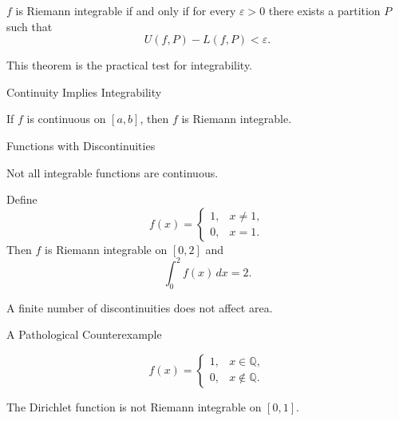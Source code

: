 \documentclass[12pt, a4paper]{article}
\begin{document}
\clearpage

\begin{theorem}
$f$ is Riemann integrable if and only if for every $\varepsilon>0$
there exists a partition $P$ such that
\[
U(f,P)-L(f,P)<\varepsilon.
\]
\end{theorem}

This theorem is the practical test for integrability.

\clearpage

\begin{heading}
Continuity Implies Integrability
\end{heading}

\begin{theorem}
If $f$ is continuous on $[a,b]$, then $f$ is Riemann integrable.
\end{theorem}

\clearpage

\begin{heading}
Functions with Discontinuities
\end{heading}

Not all integrable functions are continuous.

\begin{problem}
Define
\[
f(x)=
\begin{cases}
1, & x\neq 1,\\
0, & x=1.
\end{cases}
\]
Then $f$ is Riemann integrable on $[0,2]$ and
\[
\int_0^2 f(x)\,dx=2.
\]
\end{problem}

A finite number of discontinuities does not affect area.

\clearpage

\begin{heading}
A Pathological Counterexample
\end{heading}

\begin{definition}
\[
f(x)=
\begin{cases}
1, & x\in\mathbb{Q},\\
0, & x\notin\mathbb{Q}.
\end{cases}
\]
\end{definition}

\begin{theorem}
The Dirichlet function is not Riemann integrable on $[0,1]$.
\end{theorem}
\end{document}
